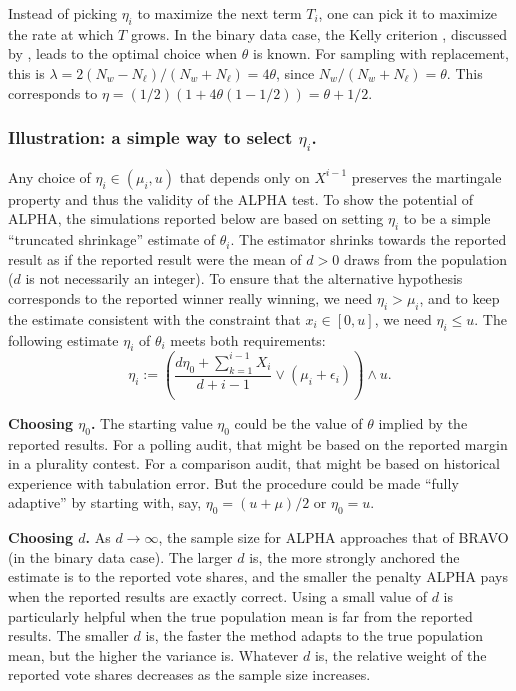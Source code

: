 \documentclass[12pt,runningheads]{llncs}
\begin{document}
{Instead of picking $\eta_i$ to maximize the next term $T_i$, one can pick it to maximize the rate at which $T$ grows.
In the binary data case, the Kelly criterion \cite{kelly56}, discussed by \cite{waudby-smithRamdas21}, leads to the
optimal choice when $\theta$ is known.
For sampling with replacement, this is $\lambda = 2(N_w-N_\ell)/(N_w+N_\ell) = 4\theta$, since $N_w/(N_w+N_\ell) = \theta$.
This corresponds to $\eta =  (1/2) \left ( 1 + 4\theta  (1-1/2) \right ) = \theta+1/2$. 

\subsubsection{Illustration: a simple way to select $\eta_i$.}
Any choice of $\eta_i \in (\mu_i, u)$ that depends only on $X^{i-1}$ preserves the martingale property and thus
the validity of the ALPHA test.
To show the potential of ALPHA, the simulations reported below are based on setting $\eta_i$ to be a simple 
``truncated shrinkage'' estimate of $\theta_i$.
The estimator shrinks towards the reported result as if the reported
result were the mean of 
$d>0$ draws from the population ($d$ is not necessarily an integer). 
To ensure that the alternative hypothesis corresponds to the reported
winner really winning, we need $\eta_i > \mu_i$, and to keep the estimate consistent with the
constraint that $x_i \in [0, u]$, we need $\eta_i \le u$.
The following estimate $\eta_i$ of $\theta_i$ meets both requirements:
\begin{equation} \label{eq:etaDef}
\eta_i :=  \left ( \frac{d\eta_0 + \sum_{k=1}^{i-1}X_i }{d+i-1} \vee (\mu_i+\epsilon_i ) \right )
\wedge u.
\end{equation}

{\bf Choosing $\eta_0$.}
The starting value $\eta_0$ could be the value of $\theta$ implied by the reported results.
For a polling audit, that might be based on the reported margin in a plurality contest.
For a comparison audit, that might be based on historical experience with tabulation error.
But the procedure could be made ``fully adaptive'' by starting with,
say, $\eta_0 = (u+\mu)/2$ or $\eta_0 = u$.

{\bf Choosing $d$.}
As $d \rightarrow \infty$, the sample size for ALPHA approaches that of BRAVO (in the binary data case).
The larger $d$ is, the more strongly anchored the estimate is to the reported vote shares, and
the smaller the penalty ALPHA pays when the reported results are exactly correct.
Using a small value of $d$ is particularly helpful when the true population mean is far from the reported results.
The smaller $d$ is, the faster the method adapts to the true population mean, but the higher the variance is.
Whatever $d$ is, the relative weight of the reported vote shares decreases as the sample size increases.

}
\end{document}
